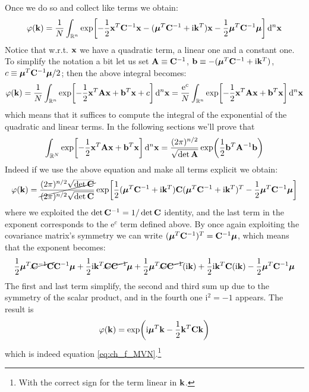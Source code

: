 \documentclass[a4paper]{article}
\newcommand{\R}{\mathbb{R}}
\newcommand{\mat}[1]{\vb{#1}}
\newcommand{\e}[1]{\mathrm{e}^{#1}}
\let\temp\phi%
\let\phi\varphi
\let\varphi\temp
\renewcommand{\i}{\mathrm{i}} %
\begin{document}
Once we do so and collect like terms we obtain:
\begin{equation*}
    \phi (\vb{k}) = \frac{1}{N} \int_{\R^n} \exp[-\frac{1}{2}\vb{x}^T\mat{C}^{-1}\vb{x} -(\vb*{\mu}^T\mat{C}^{-1} + \i \vb{k}^T)\vb{x} -\frac{1}{2} \vb*{\mu}^T \mat{C}^{-1}\vb*{\mu}] \dd[n]{\vb{x}}
\end{equation*}
Notice that w.r.t. $\vb{x}$ we have a quadratic term, a linear one and a constant one. To simplify the notation a bit let us set $\mat{A} \equiv \mat{C}^{-1}$, $\vb{b} \equiv -(\vb*{\mu}^T\mat{C}^{-1} + \i \vb{k}^T)$, $c \equiv \vb*{\mu}^T \mat{C}^{-1}\vb*{\mu}/2$; then the above integral becomes:
\begin{equation*}
    \phi (\vb{k}) = \frac{1}{N} \int_{\R^n} \exp[-\frac{1}{2}\vb{x}^T\mat{A}\vb{x} +\vb{b}^T \vb{x} +c] \dd[n]{\vb{x}} = \frac{\e{c}}{N} \int_{\R^n} \exp[-\frac{1}{2}\vb{x}^T\mat{A}\vb{x} +\vb{b}^T \vb{x}] \dd[n]{\vb{x}}
\end{equation*}
which means that it suffices to compute the integral of the exponential of the quadratic and linear terms.
In the following sections we'll prove that
\begin{equation}
    \label{eq:integrale_gaussiano}
    \int_{\R^N} \exp[-\frac{1}{2}\vb{x}^T\mat{A}\vb{x} +\vb{b}^T \vb{x}] \dd[n]{\vb{x}} = \frac{(2\pi)^{n/2}}{\sqrt{\det\mat{A}}}\exp(\frac{1}{2}\vb{b}^T \mat{A}^{-1}\vb{b})
\end{equation}
Indeed if we use the above equation and make all terms explicit we obtain:
\begin{equation*}
    \phi (\vb{k}) = \cancel{\frac{(2\pi)^{n/2}\sqrt{\det \mat{C}}}{(2\pi)^{n/2}\sqrt{\det \mat{C}}}}\exp[\frac{
    1}{2}(\vb*{\mu}^T\mat{C}^{-1} + \i \vb{k}^T)\mat{C}(\vb*{\mu}^T\mat{C}^{-1} + \i \vb{k}^T)^T -\frac{1}{2}\vb*{\mu}^T \mat{C}^{-1} \vb*{\mu}]
\end{equation*}
where we exploited the $\det\mat{C}^{-1} = 1/\det\mat{C}$ identity, and the last term in the exponent corresponds to the $\e{c}$ term defined above. By once again exploiting the covariance matrix's symmetry we can write $(\vb*{\mu}^T\mat{C}^{-1})^T = \mat{C}^{-1} \vb*{\mu}$, which means that the exponent becomes:
\begin{equation*}
    \frac{1}{2}\vb*{\mu}^T \cancel{\mat{C}^{-1} \mat{C}} \mat{C}^{-1} \vb*{\mu} + \frac{1}{2}\i \vb{k}^T \cancel{\mat{C}\mat{C}^{-1}}\vb*{\mu} + \frac{1}{2} \vb*{\mu}^T \cancel{\mat{C}\mat{C}^{-1}} (\i\vb{k})+\frac{1}{2} \i\vb{k}^T \mat{C} (\i \vb{k}) - \frac{1}{2} \vb*{\mu}^T \mat{C}^{-1} \vb*{\mu}
\end{equation*}
The first and last term simplify, the second and third sum up due to the symmetry of the scalar product, and in the fourth one $\i^2 = -1$ appears. The result is
\begin{equation*}
    \phi (\vb{k}) = \exp(\i \vb*{\mu}^T \vb{k} - \frac{1}{2}\vb{k}^T \mat{C} \vb{k})
\end{equation*}
which is indeed equation \eqref{eq:ch_f_MVN}.\footnote{With the correct sign for the term linear in $\vb{k}$.}
\end{document}
